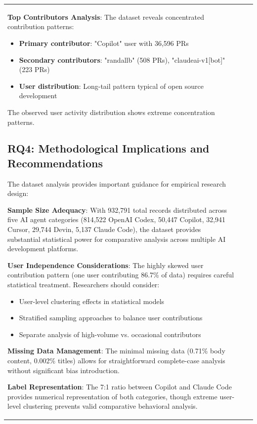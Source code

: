 \documentclass[conference]{IEEEtran}
\begin{document}
\begin{table}[t]
\begin{tabular}{@{}lrr@{}}
\textbf{Top Contributors Analysis}: The dataset reveals concentrated contribution patterns:
\begin{itemize}
    \item \textbf{Primary contributor}: "Copilot" user with 36,596 PRs
    \item \textbf{Secondary contributors}: "randallb" (508 PRs), "claudeai-v1[bot]" (223 PRs)
    \item \textbf{User distribution}: Long-tail pattern typical of open source development
\end{itemize}

The observed user activity distribution shows extreme concentration patterns.

\subsection{RQ4: Methodological Implications and Recommendations}

The dataset analysis provides important guidance for empirical research design:

\textbf{Sample Size Adequacy}: With 932,791 total records distributed across five AI agent categories (814,522 OpenAI Codex, 50,447 Copilot, 32,941 Cursor, 29,744 Devin, 5,137 Claude Code), the dataset provides substantial statistical power for comparative analysis across multiple AI development platforms.

\textbf{User Independence Considerations}: The highly skewed user contribution pattern (one user contributing 86.7\% of data) requires careful statistical treatment. Researchers should consider:
\begin{itemize}
    \item User-level clustering effects in statistical models
    \item Stratified sampling approaches to balance user contributions  
    \item Separate analysis of high-volume vs. occasional contributors
\end{itemize}

\textbf{Missing Data Management}: The minimal missing data (0.71\% body content, 0.002\% titles) allows for straightforward complete-case analysis without significant bias introduction.

\textbf{Label Representation}: The 7:1 ratio between Copilot and Claude Code provides numerical representation of both categories, though extreme user-level clustering prevents valid comparative behavioral analysis.


\end{tabular}
\end{table}
\end{document}
